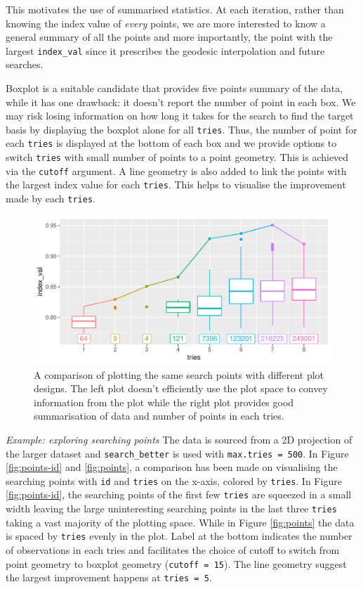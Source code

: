\documentclass[12pt]{article}
\begin{document}
This motivates the use of summarised statistics. At each iteration,
rather than knowing the index value of \emph{every} points, we are more
interested to know a general summary of all the points and more
importantly, the point with the largest \texttt{index\_val} since it
prescribes the geodesic interpolation and future searches.

Boxplot is a suitable candidate that provides five points summary of the
data, while it has one drawback: it doesn't report the number of point
in each box. We may risk losing information on how long it takes for the
search to find the target basis by displaying the boxplot alone for all
\texttt{tries}. Thus, the number of point for each \texttt{tries} is
displayed at the bottom of each box and we provide options to switch
\texttt{tries} with small number of points to a point geometry. This is
achieved via the \texttt{cutoff} argument. A line geometry is also added
to link the points with the largest index value for each \texttt{tries}.
This helps to visualise the improvement made by each \texttt{tries}.

\begin{figure}
\centering
\includegraphics{paper_files/figure-latex/points-tries-1.pdf}
\caption{\label{points}A comparison of plotting the same search points
with different plot designs. The left plot doesn't efficiently use the
plot space to convey information from the plot while the right plot
provides good summarisation of data and number of points in each tries.}
\end{figure}

\emph{Example: exploring searching points} The data is sourced from a 2D
projection of the larger dataset and \texttt{search\_better} is used
with \texttt{max.tries\ =\ 500}. In Figure \ref{fig:points-id} and
\ref{fig:points}, a comparison has been made on visualising the
searching points with \texttt{id} and \texttt{tries} on the x-axis,
colored by \texttt{tries}. In Figure \ref{fig:points-id}, the searching
points of the first few \texttt{tries} are squeezed in a small width
leaving the large uninteresting searching points in the last three
\texttt{tries} taking a vast majority of the plotting space. While in
Figure \ref{fig:points} the data is spaced by \texttt{tries} evenly in
the plot. Label at the bottom indicates the number of observations in
each tries and facilitates the choice of cutoff to switch from point
geometry to boxplot geometry (\texttt{cutoff\ =\ 15}). The line geometry
suggest the largest improvement happens at \texttt{tries\ =\ 5}.
\end{document}
